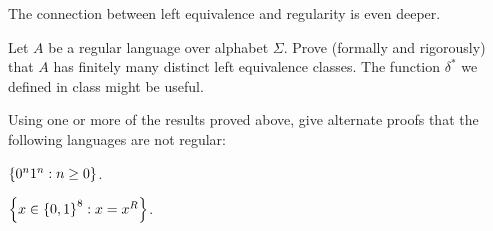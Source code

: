 \begin{problem}
  The connection between left equivalence and regularity is even deeper.
  \begin{enumalph}
    \item Let $A$ be a regular language over alphabet $\Sigma$.
      Prove (formally and rigorously) that $A$ has finitely many
      distinct left equivalence classes.
      The function $\delta^*$ we defined in class might be useful.
      \begin{Answer}
        
      \end{Answer}
    
    \item Using one or more of the results proved above, give alternate
      proofs that the following languages are not regular:
      \begin{enumroman}
        \item $\left\{0^n1^n : n \ge 0\right\}$.
          \begin{Answer}

          \end{Answer}
        \item $\left\{x \in \left\{0, 1\right\}^8 : x = x^R\right\}$.
          \begin{Answer}
            
          \end{Answer}
      \end{enumroman}
  \end{enumalph}
\end{problem}
